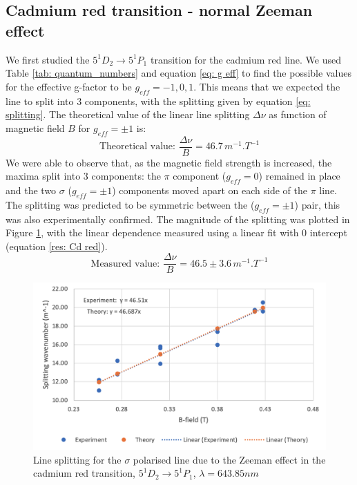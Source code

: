 \documentclass[11pt]{article}
\begin{document}
\subsection{Cadmium red transition - normal Zeeman effect} \label{sec: Cd red}
We first studied the $5^1 D_2\rightarrow 5^1 P_1$ transition for the cadmium red line. We used Table \ref{tab: quantum_numbers} and equation \eqref{eq: g eff} to find the possible values for the effective g-factor to be $g_{eff} = -1, 0, 1$. This means that we expected the line to split into 3 components, with the splitting given by equation \eqref{eq: splitting}. The theoretical value of the linear line splitting $\Delta \nu $ as function of magnetic field $B$ for $g_{eff} = \pm 1$ is: 
\begin{equation}
    \text{Theoretical value: } \frac{\Delta \nu}{B} = 46.7 \, \si{m^{-1}.T^{-1}}
\end{equation}
We were able to observe that, as the magnetic field strength is increased, the maxima split into 3 components: the $\pi$ component ($g_{eff} = 0$) remained in place and the two $\sigma$ ($g_{eff} = \pm 1$) components moved apart on each side of the $\pi$ line. The splitting was predicted to be symmetric between the ($g_{eff} = \pm 1$) pair, this was also experimentally confirmed. The magnitude of the splitting was plotted in Figure \ref{fig: Cd red}, with the linear dependence measured using a linear fit with $0$ intercept (equation \eqref{res: Cd red}). 
\begin{equation}
    \text{Measured value: } \frac{\Delta \nu}{B} = 46.5 \pm 3.6 \, \si{m^{-1}.T^{-1}}
    \label{res: Cd red}
\end{equation}
\begin{figure}
    \centering
    \includegraphics[width=0.6\linewidth]{Cd red.png}
    \caption{Line splitting for the $\sigma$ polarised line due to the Zeeman effect in the cadmium red transition, $5^1 D_2\rightarrow 5^1 P_1$, $\lambda = 643.85\si{nm}$}
    \label{fig: Cd red}
\end{figure}
\end{document}
